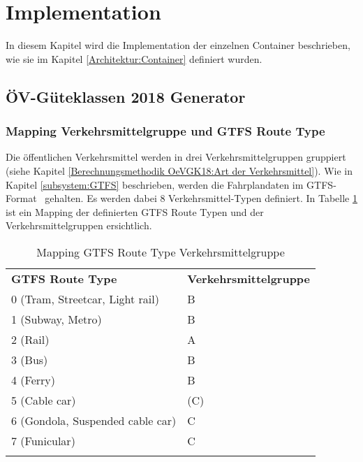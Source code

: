 
\section{Implementation}
\label{Implementation}

In diesem Kapitel wird die Implementation der einzelnen Container beschrieben, wie sie im Kapitel \ref{Architektur:Container} definiert wurden.

\subsection{ÖV-Güteklassen 2018 Generator}
\label{Implementation:ÖV-Güteklassen 2018 Generator}

\subsubsection{Mapping Verkehrsmittelgruppe und GTFS Route Type}
\label{ÖV-Güteklassen 2018 Generator:Mapping Verkehrsmittelgruppe und GTFS Route Type}

Die öffentlichen Verkehrsmittel werden in drei Verkehrsmittelgruppen gruppiert (siehe Kapitel \ref{Berechnungsmethodik OeVGK18:Art der Verkehrsmittel}).
Wie in Kapitel \ref{subsystem:GTFS} beschrieben, werden die Fahrplandaten im \acs{GTFS}-Format~\cite{gtfs_spec} gehalten. 
Es werden dabei 8 Verkehrsmittel-Typen definiert.
In Tabelle \ref{table:Mapping GTFS Route Type Verkehrsmittelgruppe} ist ein Mapping der definierten GTFS Route Typen und der Verkehrsmittelgruppen ersichtlich.

\begin{longtable}[ht]{l l}
        \midrule
        \textbf{GTFS Route Type} 
                                & \textbf{Verkehrsmittelgruppe}\\
        0 (Tram, Streetcar, Light rail)
                                & B\\
        1 (Subway, Metro)
                                & B\\
        2 (Rail)
                                & A\\
        3 (Bus)
                                & B\\
        4 (Ferry)
                                & B\\
        5 (Cable car)
                                & (C)\\
        6 (Gondola, Suspended cable car)
                                & C\\
        7 (Funicular)
                                & C\\            
        \bottomrule
    \caption{Mapping GTFS Route Type Verkehrsmittelgruppe}
    \label{table:Mapping GTFS Route Type Verkehrsmittelgruppe}
\end{longtable}
